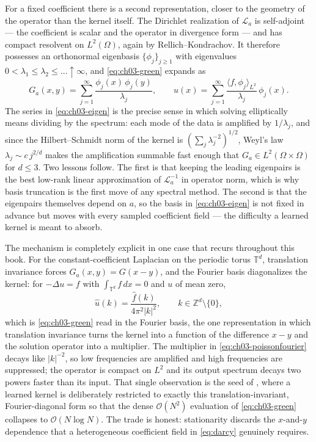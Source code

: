 For a fixed coefficient there is a second representation, closer to the geometry
of the operator than the kernel itself. The Dirichlet realization of
$\mathcal{L}_a$ is self-adjoint --- the coefficient is scalar and the operator in
divergence form --- and has compact resolvent on $L^2(\Omega)$, again by
Rellich--Kondrachov. It therefore possesses an orthonormal eigenbasis
$\{\phi_j\}_{j \ge 1}$ with eigenvalues $0 < \lambda_1 \le \lambda_2 \le \dots
\uparrow \infty$, and \eqref{eq:ch03-green} expands as
\begin{equation}
  G_a(x, y) = \sum_{j=1}^{\infty} \frac{\phi_j(x)\, \phi_j(y)}{\lambda_j},
  \qquad
  u(x) = \sum_{j=1}^{\infty} \frac{\langle f, \phi_j \rangle_{L^2}}{\lambda_j}\, \phi_j(x).
  \label{eq:ch03-eigen}
\end{equation}
The series in \eqref{eq:ch03-eigen} is the precise sense in which solving
elliptically means dividing by the spectrum: each mode of the data is amplified
by $1/\lambda_j$, and since the Hilbert--Schmidt norm of the kernel is
$(\sum_j \lambda_j^{-2})^{1/2}$, Weyl's law $\lambda_j \sim c\, j^{2/d}$ makes
the amplification summable fast enough that $G_a \in L^2(\Omega \times \Omega)$
for
$d \le 3$. Two lessons follow. The first is that keeping the leading eigenpairs
is the best low-rank linear approximation of $\mathcal{L}_a^{-1}$ in operator
norm, which is why basis truncation is the first move of any spectral method. The
second is that the eigenpairs themselves depend
on $a$, so the basis in \eqref{eq:ch03-eigen} is not fixed in advance but moves
with every sampled coefficient field --- the difficulty a learned kernel is meant
to absorb.

The mechanism is completely explicit in one case that recurs throughout this
book. For the constant-coefficient Laplacian on the periodic torus
$\mathbb{T}^d$, translation invariance forces $G_a(x,y) = G(x-y)$, and the
Fourier basis diagonalizes the kernel: for $-\Delta u = f$ with
$\int_{\mathbb{T}^d} f\,dx = 0$ and $u$ of mean zero,
\begin{equation}
  \hat{u}(k) = \frac{\hat{f}(k)}{4\pi^2 |k|^2}, \qquad k \in \mathbb{Z}^d \setminus \{0\},
  \label{eq:ch03-poissonfourier}
\end{equation}
which is \eqref{eq:ch03-green} read in the Fourier basis, the one representation
in which translation invariance turns the kernel into a function of the
difference $x - y$ and the solution operator into a multiplier. The multiplier in
\eqref{eq:ch03-poissonfourier} decays like $|k|^{-2}$, so low frequencies are
amplified and high frequencies are suppressed; the operator is compact on $L^2$
and its output spectrum decays two powers faster than its input. That single
observation is the seed of ,
where a learned kernel is deliberately restricted to exactly this
translation-invariant, Fourier-diagonal form so that the dense
$\mathcal{O}(N^2)$ evaluation of \eqref{eq:ch03-green} collapses to
$\mathcal{O}(N\log N)$. The trade is honest: stationarity discards the
$x$-and-$y$ dependence that a heterogeneous coefficient field in
\eqref{eq:darcy} genuinely requires.

